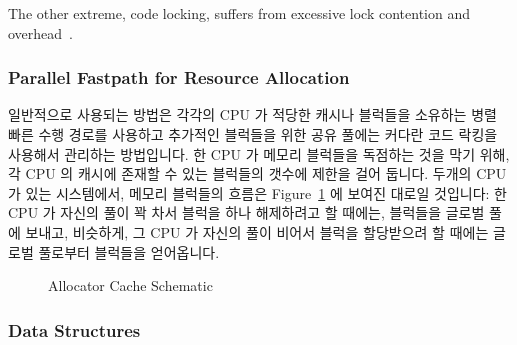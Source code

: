 The other extreme, code locking, suffers from excessive lock contention
and overhead~\cite{McKenney93}.
\fi

\subsubsection{Parallel Fastpath for Resource Allocation}

일반적으로 사용되는 방법은 각각의 CPU 가 적당한 캐시나 블럭들을 소유하는 병렬
빠른 수행 경로를 사용하고 추가적인 블럭들을 위한 공유 풀에는 커다란 코드 락킹을
사용해서 관리하는 방법입니다.
한 CPU 가 메모리 블럭들을 독점하는 것을 막기 위해, 각 CPU 의 캐시에 존재할 수
있는 블럭들의 갯수에 제한을 걸어 둡니다.
두개의 CPU 가 있는 시스템에서, 메모리 블럭들의 흐름은
Figure~\ref{fig:SMPdesign:Allocator Cache Schematic} 에 보여진 대로일 것입니다:
한 CPU 가 자신의 풀이 꽉 차서 블럭을 하나 해제하려고 할 때에는, 블럭들을 글로벌
풀에 보내고, 비슷하게, 그 CPU 가 자신의 풀이 비어서 블럭을 할당받으려 할 때에는
글로벌 풀로부터 블럭들을 얻어옵니다.

\begin{figure}[htb]
\begin{center}
\end{center}
\caption{Allocator Cache Schematic}
\label{fig:SMPdesign:Allocator Cache Schematic}
\end{figure}

\subsubsection{Data Structures}

